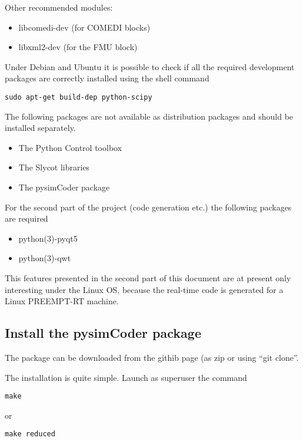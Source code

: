 Other recommended modules:

\begin{itemize}
\item libcomedi-dev (for COMEDI blocks)
\item libxml2-dev (for the FMU block)
\end{itemize}

Under Debian and Ubuntu it is possible to check if all the required development packages are correctly installed using the shell command

\begin{verbatim}
sudo apt-get build-dep python-scipy
\end{verbatim}

The following packages are not available as distribution packages and should be 
installed separately.

\begin{itemize}
\item The Python Control toolbox \cite{PYCONTROL}
\item The Slycot libraries \cite{SLYCOT}
\item The pysimCoder package \cite{SUPSICTRL}
\end{itemize}

For the second part of the project (code generation etc.) the following 
packages 
are required

\begin{itemize}
\item python(3)-pyqt5
\item  python(3)-qwt
\end{itemize}

This features presented in the second part of this document are at present only 
interesting under the Linux OS, because the real-time code is generated for a 
Linux PREEMPT-RT machine.

\subsection{Install the pysimCoder package}
The package can be downloaded from the githib page (as zip or using ``git clone''.

The installation is quite simple. Launch as superuser the command

\begin{verbatim}
make
\end{verbatim}

or

\begin{verbatim}
make reduced
\end{verbatim}

